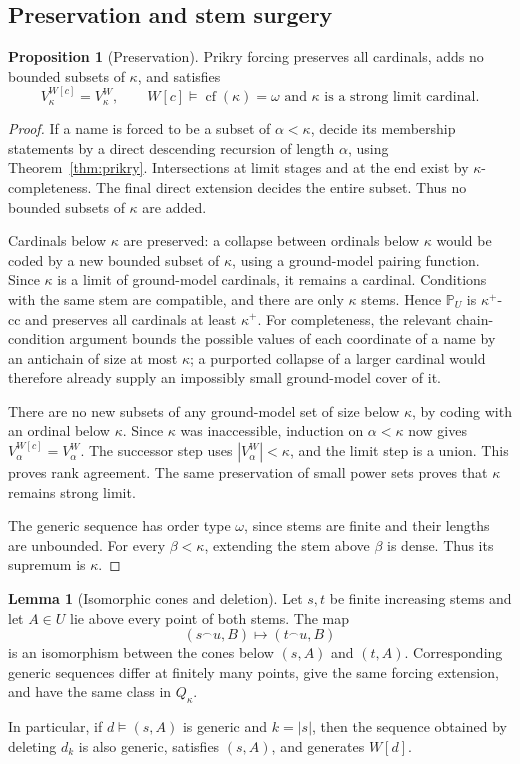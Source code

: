 \documentclass[11pt,letterpaper]{article}
\theoremstyle{definition}
\newtheorem{proposition}[definition]{Proposition}
\newtheorem{lemma}[definition]{Lemma}
\numberwithin{equation}{section}
\newcommand{\cf}{\operatorname{cf}}
\newcommand{\PPU}{\mathbb P_U}
\newcommand{\concat}{\mathbin{{}^{\frown}}}
\begin{document}
\subsection{Preservation and stem surgery}

\begin{proposition}[Preservation]\label{prop:preservation}
Prikry forcing preserves all cardinals, adds no bounded subsets of $\kappa$, and satisfies
\[
 V_\kappa^{W[c]}=V_\kappa^W,
 \qquad W[c]\models \cf(\kappa)=\omega
   \text{ and }\kappa\text{ is a strong limit cardinal}.
\]
\end{proposition}

\begin{proof}
If a name is forced to be a subset of $\alpha<\kappa$, decide its membership statements by a direct descending recursion of length $\alpha$, using Theorem~\ref{thm:prikry}. Intersections at limit stages and at the end exist by $\kappa$-completeness. The final direct extension decides the entire subset. Thus no bounded subsets of $\kappa$ are added.

Cardinals below $\kappa$ are preserved: a collapse between ordinals below $\kappa$ would be coded by a new bounded subset of $\kappa$, using a ground-model pairing function. Since $\kappa$ is a limit of ground-model cardinals, it remains a cardinal. Conditions with the same stem are compatible, and there are only $\kappa$ stems. Hence $\PPU$ is $\kappa^+$-cc and preserves all cardinals at least $\kappa^+$. For completeness, the relevant chain-condition argument bounds the possible values of each coordinate of a name by an antichain of size at most $\kappa$; a purported collapse of a larger cardinal would therefore already supply an impossibly small ground-model cover of it.

There are no new subsets of any ground-model set of size below $\kappa$, by coding with an ordinal below $\kappa$. Since $\kappa$ was inaccessible, induction on $\alpha<\kappa$ now gives $V_\alpha^{W[c]}=V_\alpha^W$. The successor step uses $|V_\alpha^W|<\kappa$, and the limit step is a union. This proves rank agreement. The same preservation of small power sets proves that $\kappa$ remains strong limit.

The generic sequence has order type $\omega$, since stems are finite and their lengths are unbounded. For every $\beta<\kappa$, extending the stem above $\beta$ is dense. Thus its supremum is $\kappa$.
\end{proof}

\begin{lemma}[Isomorphic cones and deletion]\label{lem:surgery}
Let $s,t$ be finite increasing stems and let $A\in U$ lie above every point of both stems. The map
\[
 (s\concat u,B)\longmapsto(t\concat u,B)
 \label{eq:cones}\tag{$\dagger$}
\]
is an isomorphism between the cones below $(s,A)$ and $(t,A)$. Corresponding generic sequences differ at finitely many points, give the same forcing extension, and have the same class in $Q_\kappa$.

In particular, if $d\models(s,A)$ is generic and $k=|s|$, then the sequence obtained by deleting $d_k$ is also generic, satisfies $(s,A)$, and generates $W[d]$.
\end{lemma}
\end{document}
